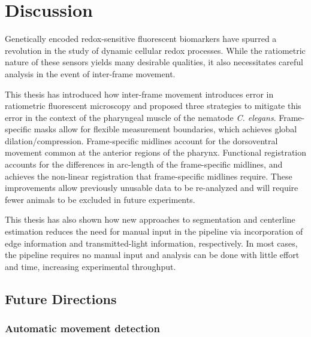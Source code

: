 \chapter{Discussion}

\label{Chapter4}

Genetically encoded redox-sensitive fluorescent biomarkers have spurred a revolution in the study of dynamic cellular redox processes. While the ratiometric nature of these sensors yields many desirable qualities, it also necessitates careful analysis in the event of inter-frame movement. 

This thesis has introduced how inter-frame movement introduces error in ratiometric fluorescent microscopy and proposed three strategies to mitigate this error in the context of the pharyngeal muscle of the nematode \textit{C. elegans}. Frame-specific masks allow for flexible measurement boundaries, which achieves global dilation/compression. Frame-specific midlines account for the dorsoventral movement common at the anterior regions of the pharynx. Functional registration accounts for the differences in arc-length of the frame-specific midlines, and achieves the non-linear registration that frame-specific midlines require. These improvements allow previously unusable data to be re-analyzed and will require fewer animals to be excluded in future experiments.

This thesis has also shown how new approaches to segmentation and centerline estimation reduces the need for manual input in the pipeline via incorporation of edge information and transmitted-light information, respectively. In most cases, the pipeline requires no manual input and analysis can be done with little effort and time, increasing experimental throughput.

\section{Future Directions}

\subsection{Automatic movement detection}

